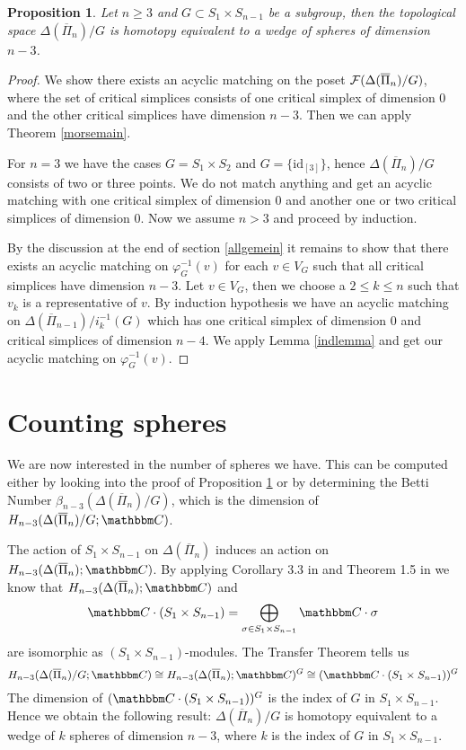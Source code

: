 \documentclass{elsarticle}
\newtheorem{prop}[df]{Proposition}
\def\id{\textrm{id}}
\def\C{\mathbbm C}
\begin{document}
\begin{prop}
\label{rdthm}
Let $n\geq3$ and $G\subset S_1\times S_{n-1}$ be a subgroup, then the topological space $\Delta(\overline{\Pi}_n)/G$ is homotopy equivalent to a wedge of spheres of dimension $n-3$.
\end{prop}
\begin{proof}
We show there exists an acyclic matching on the poset ${\cal F}(\Delta(\overline{\Pi}_n)/G)$, where the set of critical simplices consists of one critical simplex of dimension $0$ and the other critical simplices have dimension $n-3$. Then we can apply Theorem \ref{morsemain}.

For $n=3$ we have the cases $G=S_1\times S_2$ and $G=\{\id_{[3]}\}$, hence $\Delta(\overline{\Pi}_n)/G$ consists of two or three points. We do not match anything and get an acyclic matching with one critical simplex of dimension $0$ and another one or two critical simplices of dimension $0$. Now we assume $n>3$ and proceed by induction.

By the discussion at the end of section \ref{allgemein} it remains to show that there exists an acyclic matching on $\varphi_G^{-1}(v)$ for each $v\in V_G$ such that all critical simplices have dimension $n-3$. Let $v\in V_G$, then we choose a $2\leq k\leq n$ such that $v_k$ is a representative of $v$. By induction hypothesis we have an acyclic matching on $\Delta(\overline{\Pi}_{n-1})/i_k^{-1}(G)$ which has one critical simplex of dimension $0$ and critical simplices of dimension $n-4$. We apply Lemma \ref{indlemma} and get our acyclic matching on $\varphi_G^{-1}(v)$.
\end{proof}
\section{Counting spheres}
\label{giacomo}
We are now interested in the number of spheres we have. This can be computed either by looking into the proof of Proposition \ref{rdthm} or by determining the Betti Number $\beta_{n-3}(\Delta(\overline{\Pi}_n)/G)$, which is the dimension of $H_{n-3}(\Delta(\overline{\Pi}_n)/G;\C)$.

The action of $S_1\times S_{n-1}$ on $\Delta(\overline{\Pi}_n)$ induces an action on $H_{n-3}(\Delta(\overline{\Pi}_n);\C)$. By applying Corollary 3.3 in \cite{emk} and Theorem 1.5 in \cite{white} we know that $H_{n-3}(\Delta(\overline{\Pi}_n);\C)$ and
\[\C\cdot(S_1\times S_{n-1})=\bigoplus_{\sigma\in S_1\times S_{n-1}}\C\cdot\sigma\]
are isomorphic as $(S_1\times S_{n-1})$-modules. The Transfer Theorem tells us
\[
H_{n-3}(\Delta(\overline{\Pi}_n)/G;\C)\cong H_{n-3}(\Delta(\overline{\Pi}_n);\C)^G\cong(\C\cdot(S_1\times S_{n-1}))^G
\]
The dimension of $(\C\cdot(S_1\times S_{n-1}))^G$ is the index of $G$ in $S_1\times S_{n-1}$. Hence we obtain the following result: $\Delta(\overline{\Pi}_n)/G$ is homotopy equivalent to a wedge of $k$ spheres of dimension $n-3$, where $k$ is the index of $G$ in $S_1\times S_{n-1}$.
\end{document}
